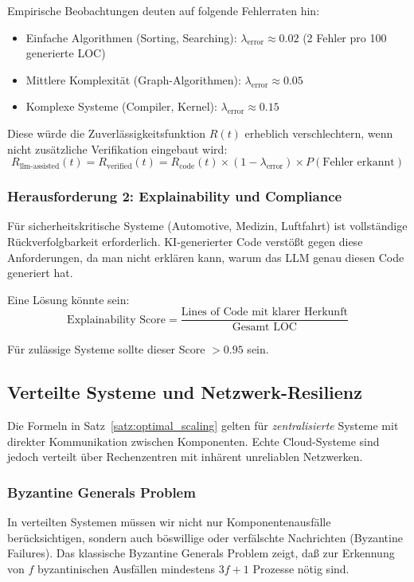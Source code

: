 \documentclass[a4paper,11pt]{article}
\theoremstyle{definition}
\begin{document}
Empirische Beobachtungen deuten auf folgende Fehlerraten hin:
\begin{itemize}
    \item Einfache Algorithmen (Sorting, Searching): $\lambda_{\text{error}} \approx 0.02$ 
          (2 Fehler pro 100 generierte LOC)
    \item Mittlere Komplexität (Graph-Algorithmen): $\lambda_{\text{error}} \approx 0.05$
    \item Komplexe Systeme (Compiler, Kernel): $\lambda_{\text{error}} \approx 0.15$
\end{itemize}

Diese würde die Zuverlässigkeitsfunktion $R(t)$ erheblich verschlechtern, wenn nicht 
zusätzliche Verifikation eingebaut wird:
\[
    R_{\text{llm-assisted}}(t) = R_{\text{verified}}(t) = R_{\text{code}}(t) \times (1 - \lambda_{\text{error}}) \times P(\text{Fehler erkannt})
\]

\subsubsection{Herausforderung 2: Explainability und Compliance}

Für sicherheitskritische Systeme (Automotive, Medizin, Luftfahrt) ist vollständige 
Rückverfolgbarkeit erforderlich. KI-generierter Code verstößt gegen diese Anforderungen, 
da man nicht erklären kann, warum das LLM genau diesen Code generiert hat.

Eine Lösung könnte sein:
\[
    \text{Explainability Score} = \frac{\text{Lines of Code mit klarer Herkunft}}{\text{Gesamt LOC}}
\]

Für zulässige Systeme sollte dieser Score $> 0.95$ sein.

\subsection{Verteilte Systeme und Netzwerk-Resilienz}

Die Formeln in Satz~\ref{satz:optimal_scaling} gelten für \emph{zentralisierte} Systeme 
mit direkter Kommunikation zwischen Komponenten. Echte Cloud-Systeme sind jedoch verteilt 
über Rechenzentren mit inhärent unreliablen Netzwerken.

\subsubsection{Byzantine Generals Problem}

In verteilten Systemen müssen wir nicht nur Komponentenausfälle berücksichtigen, sondern auch 
böswillige oder verfälschte Nachrichten (Byzantine Failures). Das klassische Byzantine Generals 
Problem zeigt, daß zur Erkennung von $f$ byzantinischen Ausfällen mindestens $3f + 1$ Prozesse 
nötig sind.
\end{document}
